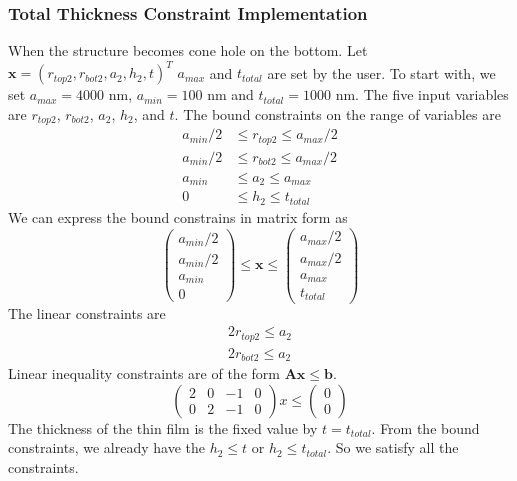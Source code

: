 \documentclass[12pt]{article}
\numberwithin{equation}{section}
\numberwithin{equation}{section}
\begin{document}
\subsubsection{Total Thickness Constraint Implementation}
When the structure becomes cone hole on the bottom. Let $\mathbf{x} = \left ( r_{top2}, r_{bot2}, a_2, h_2, t  \right )^T $ $a_{max}$ and $t_{total}$ are set by the user.  To start with, we set $a_{max} = 4000$ nm, $a_{min} = 100$ nm and $t_{total} = 1000$ nm. The five input variables are $r_{top2}$, $r_{bot2}$, $a_2$, $h_2$, and $t$. The bound constraints on the range of variables are
\begin{align*}
a_{min}/2 & \leq r_{top2} \leq a_{max}/2 \\
a_{min}/2 & \leq r_{bot2} \leq a_{max}/2 \\
a_{min} & \leq a_{2} \leq a_{max} \\
0 & \leq h_2 \leq t_{total}
\end{align*}
We can express the bound constrains in matrix form as
\begin{equation}
\left(
\begin{matrix}
a_{min}/2\\ 
a_{min}/2\\
a_{min}\\ 
0  
\end{matrix} \right )
\leq \mathbf{x}
 \leq 
 \left(
\begin{matrix}
a_{max}/2 \\ a_{max}/2 \\ a_{max}  \\ t_{total}
\end{matrix} \right )
\end{equation}
The linear constraints are 
\begin{align*}   
2r_{top2} \leq a_2 \\
2r_{bot2} \leq a_2
\end{align*}
Linear inequality constraints are of the form $\mathbf{A} \mathbf{x} \leq \mathbf{b}$.
\begin{equation}
\left(
\begin{matrix}
2 & 0 & -1 & 0 \\
0 & 2 & -1 & 0  
\end{matrix}
\right ) x  \leq \left ( \begin{matrix} 0\\ 0  \end{matrix} \right ) 
\end{equation}
The thickness of the thin film is the fixed value by $t=t_{total}$. From the bound constraints, we already have the $h_2 \leq t$ or $h_2 \leq t_{total}$. So we satisfy all the constraints.\\
\end{document}
